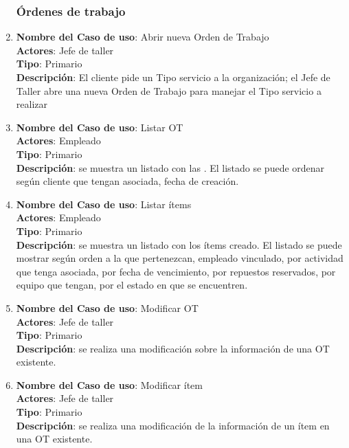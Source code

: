 \documentclass[12pt]{extarticle}
\begin{document}
\begin{spacing}{1.2}
\begin{enumerate}
        \subsubsection{Órdenes de trabajo}



        \item 	\textbf{Nombre del Caso de uso}: Abrir nueva Orden de Trabajo\\
                \textbf{Actores}: Jefe de taller\\
                \textbf{Tipo}: Primario\\
                \textbf{Descripción}: El cliente pide un Tipo servicio a la organización; el Jefe de Taller abre una nueva Orden de Trabajo para manejar el Tipo servicio a realizar

        \item 	\textbf{Nombre del Caso de uso}: Listar OT\\
                \textbf{Actores}: Empleado\\
                \textbf{Tipo}: Primario\\
                \textbf{Descripción}: se muestra un listado con las \OTs{}. El listado se puede ordenar según cliente que tengan asociada, fecha de creación.

        \item 	\textbf{Nombre del Caso de uso}: Listar ítems\\
                \textbf{Actores}: Empleado\\
                \textbf{Tipo}: Primario\\
                \textbf{Descripción}: se muestra un listado con los ítems creado. El listado se puede mostrar según orden a la que pertenezcan, empleado vinculado, por actividad que tenga asociada, por fecha de vencimiento, por repuestos reservados, por equipo que tengan, por el estado en que se encuentren.

        \item 	\textbf{Nombre del Caso de uso}: Modificar OT\\
                \textbf{Actores}: Jefe de taller\\
                \textbf{Tipo}: Primario\\
                \textbf{Descripción}: se realiza una modificación sobre la información de una OT existente.

        \item 	\textbf{Nombre del Caso de uso}: Modificar ítem\\
                \textbf{Actores}: Jefe de taller\\
                \textbf{Tipo}: Primario\\
                \textbf{Descripción}: se realiza una modificación de la información de un ítem en una OT existente. 


\end{enumerate}
\end{spacing}
\end{document}
